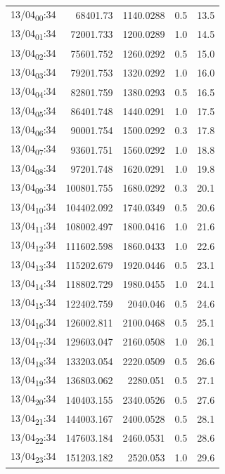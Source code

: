 \documentclass[11pt]{article}
\begin{document}
\begin{center}
\begin{tabular}{lrrrr}
13/04\textsubscript{00}:34 & 68401.73 & 1140.0288 & 0.5 & 13.5\\[0pt]
13/04\textsubscript{01}:34 & 72001.733 & 1200.0289 & 1.0 & 14.5\\[0pt]
13/04\textsubscript{02}:34 & 75601.752 & 1260.0292 & 0.5 & 15.0\\[0pt]
13/04\textsubscript{03}:34 & 79201.753 & 1320.0292 & 1.0 & 16.0\\[0pt]
13/04\textsubscript{04}:34 & 82801.759 & 1380.0293 & 0.5 & 16.5\\[0pt]
13/04\textsubscript{05}:34 & 86401.748 & 1440.0291 & 1.0 & 17.5\\[0pt]
13/04\textsubscript{06}:34 & 90001.754 & 1500.0292 & 0.3 & 17.8\\[0pt]
13/04\textsubscript{07}:34 & 93601.751 & 1560.0292 & 1.0 & 18.8\\[0pt]
13/04\textsubscript{08}:34 & 97201.748 & 1620.0291 & 1.0 & 19.8\\[0pt]
13/04\textsubscript{09}:34 & 100801.755 & 1680.0292 & 0.3 & 20.1\\[0pt]
13/04\textsubscript{10}:34 & 104402.092 & 1740.0349 & 0.5 & 20.6\\[0pt]
13/04\textsubscript{11}:34 & 108002.497 & 1800.0416 & 1.0 & 21.6\\[0pt]
13/04\textsubscript{12}:34 & 111602.598 & 1860.0433 & 1.0 & 22.6\\[0pt]
13/04\textsubscript{13}:34 & 115202.679 & 1920.0446 & 0.5 & 23.1\\[0pt]
13/04\textsubscript{14}:34 & 118802.729 & 1980.0455 & 1.0 & 24.1\\[0pt]
13/04\textsubscript{15}:34 & 122402.759 & 2040.046 & 0.5 & 24.6\\[0pt]
13/04\textsubscript{16}:34 & 126002.811 & 2100.0468 & 0.5 & 25.1\\[0pt]
13/04\textsubscript{17}:34 & 129603.047 & 2160.0508 & 1.0 & 26.1\\[0pt]
13/04\textsubscript{18}:34 & 133203.054 & 2220.0509 & 0.5 & 26.6\\[0pt]
13/04\textsubscript{19}:34 & 136803.062 & 2280.051 & 0.5 & 27.1\\[0pt]
13/04\textsubscript{20}:34 & 140403.155 & 2340.0526 & 0.5 & 27.6\\[0pt]
13/04\textsubscript{21}:34 & 144003.167 & 2400.0528 & 0.5 & 28.1\\[0pt]
13/04\textsubscript{22}:34 & 147603.184 & 2460.0531 & 0.5 & 28.6\\[0pt]
13/04\textsubscript{23}:34 & 151203.182 & 2520.053 & 1.0 & 29.6\\[0pt]

\end{tabular}
\end{center}
\end{document}
